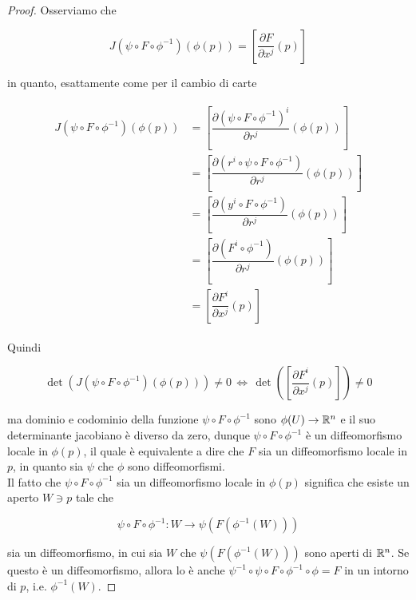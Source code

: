 \begin{proof}
	Osserviamo che
	
	\begin{equation}
		J(\psi \circ F \circ \phi^{-1})(\phi(p)) = \left[ \dfrac{\partial F}{\partial x^{j}} (p) \right]
	\end{equation}

	in quanto, esattamente come per il cambio di carte
	
	\begin{align}
		\begin{split}
			J(\psi \circ F \circ \phi^{-1})(\phi(p)) &= \left[ \dfrac{\partial (\psi \circ F \circ \phi^{-1})^{i}}{\partial r^{j}} (\phi(p)) \right]\\
			&= \left[ \dfrac{\partial (r^{i} \circ \psi \circ F \circ \phi^{-1})}{\partial r^{j}} (\phi(p)) \right]\\
			&= \left[ \dfrac{\partial (y^{i} \circ F \circ \phi^{-1})}{\partial r^{j}} (\phi(p)) \right]\\
			&= \left[ \dfrac{\partial (F^{i} \circ \phi^{-1})}{\partial r^{j}} (\phi(p)) \right]\\
			&= \left[ \dfrac{\partial F^{i}}{\partial x^{j}} (p) \right]
		\end{split}
	\end{align}

	Quindi
	
	\begin{equation}
		\det( J(\psi \circ F \circ \phi^{-1})(\phi(p)) ) \neq 0 \, \iff \, \det( \left[ \dfrac{\partial F^{i}}{\partial x^{j}} (p) \right] ) \neq 0
	\end{equation}

	ma dominio e codominio della funzione $ \psi \circ F \circ \phi^{-1} $ sono $ \phi(U) \to \mathbb{R}^{n} $ e il suo determinante jacobiano è diverso da zero, dunque $ \psi \circ F \circ \phi^{-1} $ è un diffeomorfismo locale in $ \phi(p) $, il quale è equivalente a dire che $ F $ sia un diffeomorfismo locale in $ p $, in quanto sia $ \psi $ che $ \phi $ sono diffeomorfismi.\\
	Il fatto che $ \psi \circ F \circ \phi^{-1} $ sia un diffeomorfismo locale in $ \phi(p) $ significa che esiste un aperto $ W \ni p $ tale che
	
	\begin{equation}
		\psi \circ F \circ \phi^{-1} : W \to \psi(F(\phi^{-1}(W)))
	\end{equation}

	sia un diffeomorfismo, in cui sia $ W $ che $ \psi(F(\phi^{-1}(W))) $ sono aperti di $ \mathbb{R}^{n} $. Se questo è un diffeomorfismo, allora lo è anche $ \psi^{-1} \circ \psi \circ F \circ \phi^{-1} \circ \phi = F $ in un intorno di $ p $, i.e. $ \phi^{-1}(W) $.
\end{proof}


